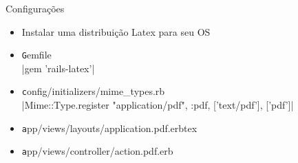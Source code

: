 \documentclass{beamer}
\begin{document}
  \begin{frame}{Configurações}
    \begin{center}
      \begin{itemize}
        \item Instalar uma distribuição Latex para seu OS
        \item {\texttt Gemfile}\\|gem 'rails-latex'|
        \item {\texttt config/initializers/mime\_types.rb}\\{\scriptsize {}|Mime::Type.register "application/pdf", :pdf, ['text/pdf'], ['pdf']|}
        \item {\texttt app/views/layouts/application.pdf.erbtex}
        \item {\texttt app/views/controller/action.pdf.erb}
      \end{itemize}
    \end{center}
  \end{frame}
  \begin{frame}[plain]
    \titlepage
  \end{frame}
\end{document}

